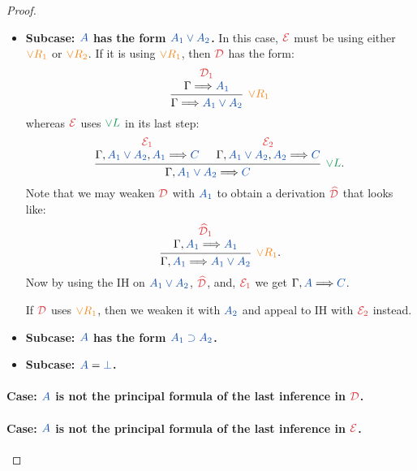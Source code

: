 \begin{proof}
\begin{itemize}
    \item \textbf{Subcase: $\prp{A}$ has the form $\prp{A_1 \lor A_2}$.}
    In this case, $\drv{E}$ must be using either $\rightRule{\lor R_1}$
    or $\rightRule{\lor R_2}$. If it is using $\rightRule{\lor R_1}$, then
    $\drv{D}$ has the form:
    \[
      \begin{prooftree}
        \hypo{\drv{D}[1]}
        \infer[no rule]1{\sequent{A_1}}
        \infer1[$\rightRule{\lor R_1}$]{\sequent{A_1 \lor A_2}}
      \end{prooftree}
    \]
    whereas $\drv{E}$ uses $\leftRule{\lor L}$ in its last step:
    \[
      \begin{prooftree}
        \hypo{\drv{E}[1]}
        \infer[no rule]1{\sequent[A_1 \lor A_2][A_1]{C}}
        \hypo{\drv{E}[2]}
        \infer[no rule]1{\sequent[A_1 \lor A_2][A_2]{C}}
        \infer2[$\leftRule{\lor L}$.]{\sequent[A_1 \lor A_2]{C}}
      \end{prooftree}
    \]
    Note that we may weaken $\drv{D}$ with $\prp{A_1}$ to obtain a derivation
    $\drv{\widehat{D}}$ that looks like:
    \[
      \begin{prooftree}
        \hypo{\drv{\widehat{D}}[1]}
        \infer[no rule]1{\sequent[A_1]{A_1}}
        \infer1[$\rightRule{\lor R_1}$.]{\sequent[A_1]{A_1 \lor A_2}}
      \end{prooftree}
    \]
    Now by using the IH on $\prp{A_1 \lor A_2}$, $\drv{\widehat{D}}$, and,
    $\drv{E}[1]$ we get $\sequent[A]{C}$.

    If $\drv{D}$ uses $\rightRule{\lor R_1}$, then we weaken it with
    $\prp{A_2}$ and appeal to IH with $\drv{E}[2]$ instead.

    \item \textbf{Subcase: $\prp{A}$ has the form $\prp{A_1 \supset A_2}$.}
    \item \textbf{Subcase: $\prp{A} = \prp{\bot}$.}
  \end{itemize}

  \paragraph{Case: $\prp{A}$ is not the principal formula of the last
  inference in $\drv{D}$.}\quad

  \paragraph{Case: $\prp{A}$ is not the principal formula of the last
  inference in $\drv{E}$.}\quad

\end{proof}




